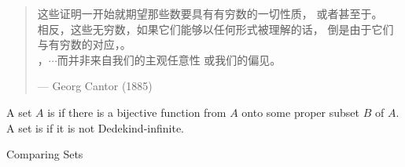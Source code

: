 \begin{frame}{}
  \begin{quote}
    这些证明一开始就期望那些数要具有有穷数的一切性质，
    或者甚至于。\\[6pt]

    相反，这些无穷数，如果它们能够以任何形式被理解的话，
    倒是由于它们与有穷数的对应，。\\[6pt]

    ，$\cdots$而并非来自我们的主观任意性
    或我们的偏见。

    \hfill --- Georg Cantor (1885)
  \end{quote}

  \pause
  \vspace{0.40cm}
  \begin{definition}
    A set $A$ is  if there is a bijective function from $A$ onto some proper subset $B$ of $A$. \\[3pt]
    
    A set is  if it is not Dedekind-infinite.
  \end{definition}
\end{frame}

\begin{frame}{}

  \centerline{\LARGE Comparing Sets}

  \pause
  \vspace{-0.30cm}
  \begin{columns}
  \end{columns}

  \pause
  \centerline{\Large {}}
\end{frame}
